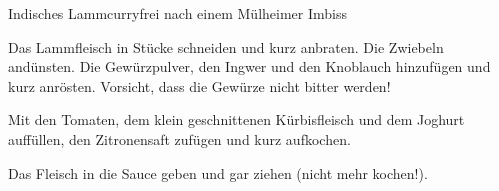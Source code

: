 \begin{recipe}{Indisches Lammcurry}{frei nach einem Mülheimer Imbiss}
  \label{Indisches Lammcurry}
  \inglist

  \steps

  Das Lammfleisch in Stücke schneiden und kurz anbraten. Die Zwiebeln
  andünsten. Die Gewürzpulver, den Ingwer und den Knoblauch hinzufügen und kurz
  anrösten. Vorsicht, dass die Gewürze nicht bitter werden!

  Mit den Tomaten, dem klein geschnittenen Kürbisfleisch und dem Joghurt
  auffüllen, den Zitronensaft zufügen und kurz aufkochen.

  Das Fleisch in die Sauce geben und gar ziehen (nicht mehr kochen!).

\end{recipe}
